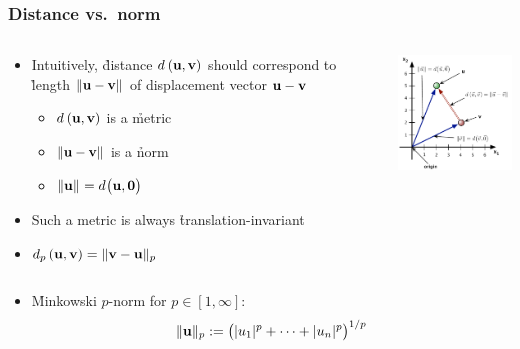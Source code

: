 \begin{frame}
  \frametitle{Distance vs.\ norm}

  \begin{columns}[T]
    \begin{column}{50mm}
      \begin{itemize}
      \item<1-> Intuitively, \h{distance} $\dist{\vu}{\vv}$ should correspond to
        \h{length} $\norm{\vu-\vv}$ of displacement vector $\vu - \vv$
        \begin{itemize}
        \item $\dist{\vu}{\vv}$ is a \h{metric}
        \item $\norm{\vu-\vv}$ is a \h{norm}
        \item $\norm{\vu} = \bigdist{\vu}{\vnull}$
        \end{itemize}
      \item<2-> Such a metric is always \h{translation-invariant}%
        \gap
      \item<3-> $\dist[p]{\vu}{\vv} = \norm[p]{\vv-\vu}$
      \end{itemize}
    \end{column}
    \begin{column}{50mm}
      \includegraphics[width=50mm]{img/2_distance_norm}
    \end{column}
  \end{columns}

  \begin{itemize}
  \item<3-> \h{Minkowski $p$-norm} for $p\in [1,\infty]$:
    \[
    \norm[p]{\vu} \coloneq \bigl(\abs{u_1}^p + \dots + \abs{u_n}^p\bigr)^{1/p}
    \]
  \end{itemize}
\end{frame}

